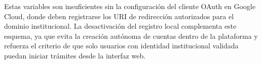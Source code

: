 Estas variables son insuficientes sin la configuración del cliente OAuth en Google Cloud, donde deben registrarse los URI de redirección autorizados para el dominio institucional. La desactivación del registro local complementa este esquema, ya que evita la creación autónoma de cuentas dentro de la plataforma y refuerza el criterio de que solo usuarios con identidad institucional validada puedan iniciar trámites desde la interfaz web.